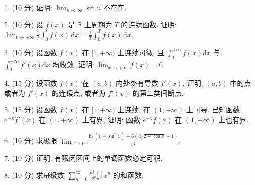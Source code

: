 \documentclass{examcollection}
\begin{document}
{\begin{minipage}{\textwidth}
1. (10 分) 证明: $\lim_{n \to \infty} \sin n$ 不存在.\par
2. (10 分) 设 $f(x)$ 是 $\mathbb{R}$ 上周期为 $T$ 的连续函数. 证明: $\lim_{t \to +\infty} \frac{1}{t} \int_{0}^{t} f(x) \, \mathrm{d}x = \frac{1}{T} \int_{0}^{T} f(x) \, \mathrm{d}x$.\par
3. (10 分) 设函数 $f(x)$ 在 $[1, +\infty)$ 上连续可微, 且 $\int_{1}^{+\infty} f(x) \mathrm{d}x$ 与 $\int_{1}^{+\infty} f'(x) \mathrm{d}x$ 均收敛, 证明: $\lim_{x \to +\infty} f(x) = 0$.\par
4. (15 分) 设函数 $f(x)$ 在 $(a, b)$ 内处处有导数 $f'(x)$. 证明: $(a, b)$ 中的点或者为 $f'(x)$ 的连续点, 或者为 $f'(x)$ 的第二类间断点.\par
5. (15 分) 设函数 $f(x)$ 在 $[1, +\infty)$ 上连续, 在 $(1, +\infty)$ 上可导, 已知函数 $e^{-x}f'(x)$ 在 $(1, +\infty)$ 上有界, 证明: 函数 $e^{-x}f(x)$ 在 $(1, +\infty)$ 上也有界.\par
6. (10 分) 求极限 $\lim_{x\to 0}\frac{\ln(1 + \sin^2 x) - 6(\sqrt[3]{2 - \cos x} - 1)}{x^4}$.\par
7. (10 分) 证明: 有限闭区间上的单调函数必定可积.\par
8. (10 分) 求幂级数 $\sum_{n=0}^{\infty} \frac{n^2 + 1}{2^n n!} x^n$ 的和函数.\par
\end{minipage}}
\ifdim\dimexpr\ht\proofbox+\dp\proofbox\relax>\textheight
\noindent\resizebox{!}{\textheight}{\usebox{\proofbox}}\else\noindent\usebox{\proofbox}\fi\clearpage
\end{document}
